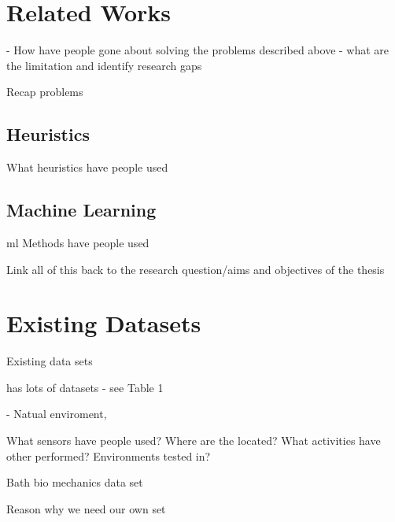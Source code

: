 \section{Related Works} - %
How have people gone about solving the problems described above - what are the limitation and identify research gaps

Recap problems


\subsection{Heuristics}
What heuristics have people used

\subsection{Machine Learning} %
\acrshort{ml} Methods have people used


Link all of this back to the research question/aims and objectives of the thesis


\section{Existing Datasets} %
Existing data sets

\cite{Cruciani2020} has lots of datasets - see Table 1

\cite{Vaizman2017} - Natual enviroment,

\cite{Fu2021}

What sensors have people used? Where are the located? What activities have other performed? Environments tested in?

Bath bio mechanics data set

Reason why we need our own set

